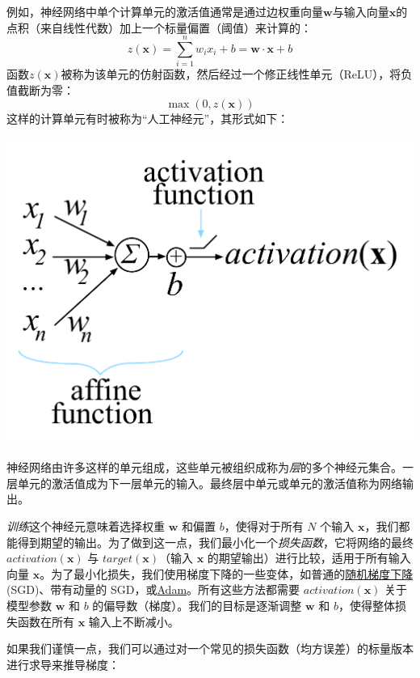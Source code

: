 \documentclass[11pt]{article}
\begin{document}
例如，神经网络中单个计算单元的激活值通常是通过边权重向量$\mathbf{w}$与输入向量$\mathbf{x}$的点积（来自线性代数）加上一个标量偏置（阈值）来计算的：
\[ z(\mathbf{x}) = \sum_{i=1}^n w_i x_i + b = \mathbf{w} \cdot \mathbf{x} + b \]
函数$z(\mathbf{x})$被称为该单元的仿射函数，然后经过一个修正线性单元（ReLU），将负值截断为零：
\[ \max(0, z(\mathbf{x})) \]
这样的计算单元有时被称为“人工神经元”，其形式如下：

\begin{center}
\includegraphics{neuron.png}
\end{center}

神经网络由许多这样的单元组成，这些单元被组织成称为{\em 层}的多个神经元集合。一层单元的激活值成为下一层单元的输入。最终层中单元或单元的激活值称为网络输出。

{\em 训练}这个神经元意味着选择权重 $\mathbf{w}$ 和偏置 $b$，使得对于所有 $N$ 个输入 $\mathbf{x}$，我们都能得到期望的输出。为了做到这一点，我们最小化一个{\em 损失函数}，它将网络的最终 $activation(\mathbf{x})$ 与 $target(\mathbf{x})$（输入 $\mathbf{x}$ 的期望输出）进行比较，适用于所有输入向量 $\mathbf{x}$。为了最小化损失，我们使用梯度下降的一些变体，如普通的\href{https://en.wikipedia.org/wiki/Stochastic_gradient_descent}{随机梯度下降} (SGD)、带有动量的 SGD，或\href{https://en.wikipedia.org/wiki/Stochastic_gradient_descent\#Adam}{Adam}。所有这些方法都需要 $activation(\mathbf{x})$ 关于模型参数 $\mathbf{w}$ 和 $b$ 的偏导数（梯度）。我们的目标是逐渐调整 $\mathbf{w}$ 和 $b$，使得整体损失函数在所有 $\mathbf{x}$ 输入上不断减小。

如果我们谨慎一点，我们可以通过对一个常见的损失函数（均方误差）的标量版本进行求导来推导梯度：
\end{document}
